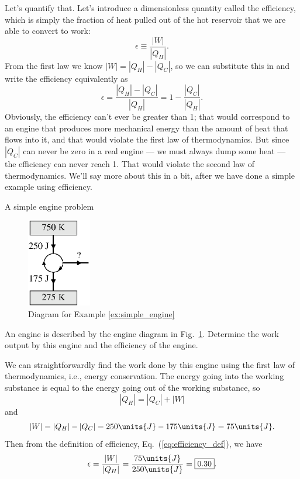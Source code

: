 Let's quantify that.  Let's introduce a dimensionless quantity called
the efficiency, which is simply the fraction of heat pulled out of the
hot reservoir that we are able to convert to work:
\begin{equation}
\epsilon \equiv \frac{|W|}{|Q_H|}.
\label{eq:efficiency_def}
\end{equation}
From the first law we know $|W|=|Q_H|-|Q_C|$, so we can substitute
this in and write the efficiency equivalently as
\begin{equation}
\epsilon = \frac{|Q_H|-|Q_C|}{|Q_H|} = 1 - \frac{|Q_C|}{|Q_H|}.
\label{eq:general_efficiency}
\end{equation}
Obviously, the efficiency can't ever be greater than 1;
that would correspond to an engine that produces more mechanical energy
than the amount of heat that flows into it, and that would violate the
first law of thermodynamics.  But since $|Q_C|$ can never be zero in
a real engine --- we must always dump some heat --- the efficiency can
never reach 1.   That would violate the second law of thermodynamics.
We'll say more about this in a bit, after we have done a simple example
using efficiency.

\begin{example}{A simple engine problem}
\label{ex:simple_engine}

\begin{figure}[b]
\begin{center}
\includegraphics[width=1.1in]{heat_engines/engine_for_example.eps}
\caption{Diagram for Example \ref{ex:simple_engine}}
\label{fig:engine_for_example}
\end{center}
\end{figure}
An engine is described by the engine diagram in
Fig.~\ref{fig:engine_for_example}.  Determine the work output by this
engine and the efficiency of the engine.

\solution
We can straightforwardly find the work done
by this engine using the first law of thermodynamics, i.e., energy
conservation.  The energy going into the working substance is
equal to the energy going out of the working substance, so
\begin{equation}
|Q_H| = |Q_C| + |W|
\end{equation}
and
\begin{equation}
|W| = |Q_H| - |Q_C| = 250\units{J} - 175\units{J} = 75\units{J} .
\end{equation}
Then from the definition of efficiency, Eq.~(\ref{eq:efficiency_def}),
we have
\begin{equation*}
\epsilon = \frac{|W|}{|Q_H|}  = \frac{75\units{J}}{250\units{J}} = \boxed{0.30}.
\end{equation*}
\end{example}

